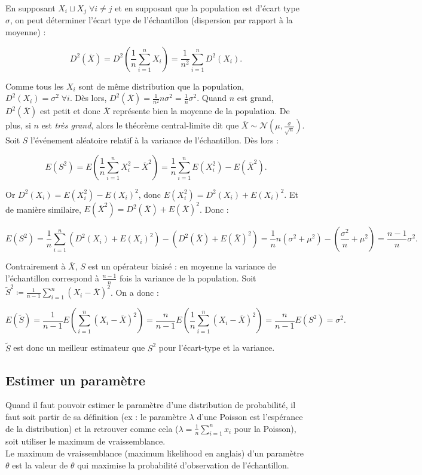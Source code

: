 \documentclass{article}
\begin{document}
		En supposant $X_i \sqcup X_j \; \forall i \neq j$ et en supposant que la population est d'écart type $\sigma$, on peut déterminer l'écart type de l'échantillon (dispersion par rapport
		à la moyenne) :

		\[D^2(\overline X) = D^2\left(\frac 1n\sum_{i=1}^nX_i\right) = \frac 1{n^2}\sum_{i=1}^nD^2(X_i).\]

		Comme tous les $X_i$ sont de même distribution que la population, $D^2(X_i) = \sigma^2 \;\forall i$. Dès lors, $D^2(\overline X) = \frac 1{n^2}n\sigma^2 = \frac 1n\sigma^2$. Quand $n$ est grand,
		$D^2(\overline X)$ est petit et donc $\overline X$ représente bien la moyenne de la population. De plus, si $n$ est \textit{très grand}, alors le théorème central-limite dit que
		$\overline X \sim \mathcal N\left(\mu, \frac \sigma{\sqrt n}\right)$. Soit $S$ l'événement aléatoire relatif à la variance de l'échantillon. Dès lors :

		\[E(S^2) = E\left(\frac 1n\sum_{i=1}^nX_i^2-\overline X^2\right) = \frac 1n\sum_{i=1}^nE(X_i^2) - E(\overline X^2).\]

		Or $D^2(X_i) = E(X_i^2) - E(X_i)^2$, donc $E(X_i^2) = D^2(X_i) + E(X_i)^2$. Et de manière similaire, $E(\overline X^2) = D^2(\overline X) + E(\overline X)^2$. Donc :

		\[E(S^2) = \frac 1n\sum_{i=1}^n(D^2(X_i) + E(X_i)^2) - (D^2(\overline X) + E(\overline X)^2) = \frac 1nn(\sigma^2 + \mu^2) - (\frac {\sigma^2}n + \mu^2) = \frac {n-1}n\sigma^2.\]

		Contrairement à $\overline X$, $S$ est un opérateur biaisé : en moyenne la variance de l'échantillon correspond à $\frac {n-1}n$ fois la variance de la population. Soit
		$\widetilde S^2 \coloneqq \frac 1{n-1} \sum_{i=1}^n(X_i-\overline X)^2$. On a donc :

		\[E(\widetilde S) = \frac 1{n-1}E\left(\sum_{i=1}^n(X_i-\overline X)^2\right) = \frac n{n-1}E\left(\frac 1n\sum_{i=1}^n(X_i-\overline X)^2\right) = \frac n{n-1}E(S^2) = \sigma^2.\]

		$\widetilde S$ est donc un meilleur estimateur que $S^2$ pour l'écart-type et la variance.

	\subsection{Estimer un paramètre}
		Quand il faut pouvoir estimer le paramètre d'une distribution de probabilité, il faut soit partir de sa définition (ex : le paramètre $\lambda$ d'une Poisson est l'espérance de la distribution)
		et la retrouver comme cela ($\lambda = \frac 1n\sum_{i=1}^nx_i$ pour la Poisson), soit utiliser le maximum de vraissemblance. \\
		Le maximum de vraissemblance (maximum likelihood en anglais) d'un paramètre $\theta$ est la valeur de $\theta$ qui maximise la probabilité d'observation de l'échantillon.
\end{document}
